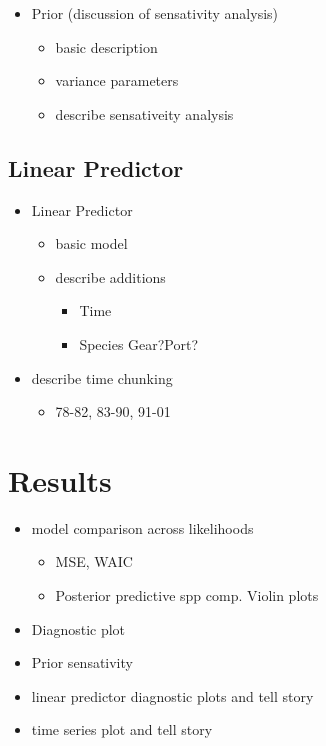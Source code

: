 \documentclass[12pt]{article}
\begin{document}
%


\begin{itemize}
\item Prior (discussion of sensativity analysis)
	\begin{itemize}
	\item basic description
	\item variance parameters
	\item describe sensativeity analysis
	\end{itemize}
\end{itemize}

%


%
%
\subsection{Linear Predictor}
%
%


\begin{itemize}
\item Linear Predictor 
	\begin{itemize}
	\item basic model
	\item describe additions
		\begin{itemize}
		\item Time
		\item Species Gear?Port?
		\end{itemize}
	\end{itemize}
\item describe time chunking
	\begin{itemize}
	\item 78-82, 83-90, 91-01
	\end{itemize}
\end{itemize}

%
%
\section{Results}\label{results}
%
%

%
\begin{itemize}
\item model comparison across likelihoods 
	\begin{itemize}
	\item MSE, WAIC
	\item Posterior predictive spp comp. Violin plots
	\end{itemize}
\item Diagnostic plot
\item Prior sensativity
\item linear predictor diagnostic plots and tell story
\item time series plot and tell story
\end{itemize}
\end{document}

